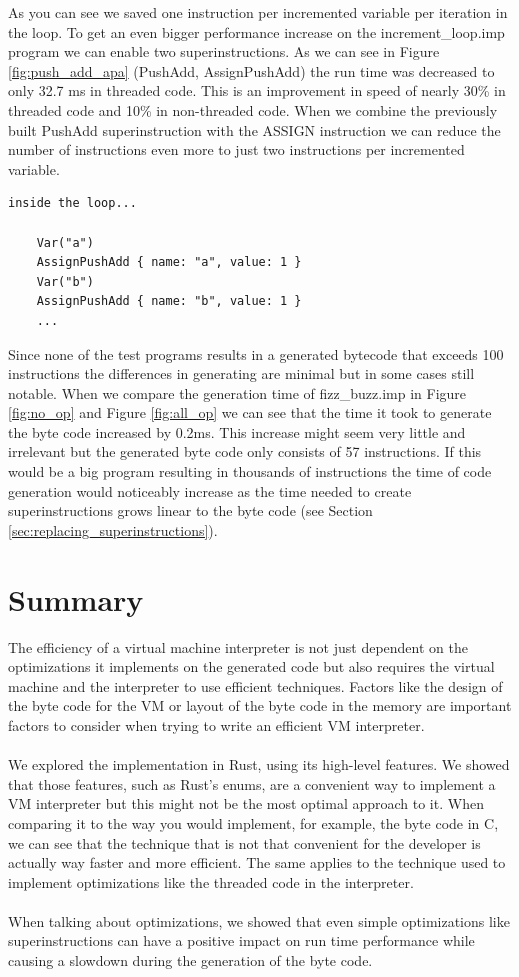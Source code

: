 \documentclass{article}
\begin{document}
As you can see we saved one instruction per incremented variable per
iteration in the loop. 
To get an even bigger performance increase on the increment\_loop.imp program
we can enable two superinstructions. As we can see in Figure
\ref{fig:push_add_apa} (PushAdd, AssignPushAdd) the run time was decreased to
only 32.7 ms in threaded code. This is an improvement in speed of nearly 30\%
in threaded code and 10\% in non-threaded code.
When we combine the previously built PushAdd superinstruction with the ASSIGN
instruction we can reduce the number of instructions even more to just two
instructions per incremented variable.

\begin{verbatim}
inside the loop...

    Var("a")
    AssignPushAdd { name: "a", value: 1 }
    Var("b")
    AssignPushAdd { name: "b", value: 1 }
    ...
\end{verbatim}

Since none of the test programs results in a generated bytecode that exceeds
100 instructions the differences in generating are minimal but in some cases
still notable. When we compare the generation time of fizz\_buzz.imp in Figure
\ref{fig:no_op} and Figure \ref{fig:all_op} we can see that the time it took to
generate the byte code increased by 0.2ms. This increase might seem very little
and irrelevant but the generated byte code only consists of 57 instructions. If
this would be a big program resulting in thousands of instructions the time of
code generation would noticeably increase as the time needed to create
superinstructions grows linear to the byte code (see Section
\ref{sec:replacing_superinstructions}).

\section{Summary}
The efficiency of a virtual machine interpreter is not just dependent on the
optimizations it implements on the generated code but also requires the virtual
machine and the interpreter to use efficient techniques. Factors like the
design of the byte code for the VM or layout of the byte code in the memory are
important factors to consider when trying to write an efficient VM interpreter.
\\\\
We explored the implementation in Rust, using its high-level features. We
showed that those features, such as Rust's enums, are a convenient way to
implement a VM interpreter but this might not be the most optimal approach to it.
When comparing it to the way you would implement, for example, the byte code in
C, we can see that the technique that is not that convenient for the developer
is actually way faster and more efficient. The same applies to the technique
used to implement optimizations like the threaded code in the interpreter.
\\\\
When talking about optimizations, we showed that even simple optimizations like
superinstructions can have a positive impact on run time performance while
causing a slowdown during the generation of the byte code. 
\end{document}
